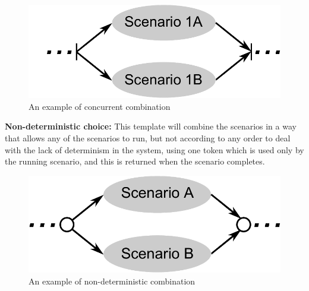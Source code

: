 \documentclass[british,compsoc]{IEEEtran}
\begin{document}
\begin{figure}[h]
\begin{centering}
\includegraphics[scale=0.45]{Images/concurrent_combination}
\par\end{centering}

\begin{centering}
\protect\caption{\label{fig:concurrent_combination}An example of concurrent combination}

\par\end{centering}

\end{figure}

\textbf{Non-deterministic choice:} This template will combine the
scenarios in a way that allows any of the scenarios to run, but not
according to any order to deal with the lack of determinism in the
system, using one token which is used only by the running scenario,
and this is returned when the scenario completes.

\begin{figure}[h]
\begin{centering}
\includegraphics[scale=0.45]{Images/non_deterministic_combination}
\par\end{centering}

\begin{centering}
\protect\caption{\label{fig:non_deterministic_combination}An example of non-deterministic combination}

\par\end{centering}

\end{figure}
\end{document}
